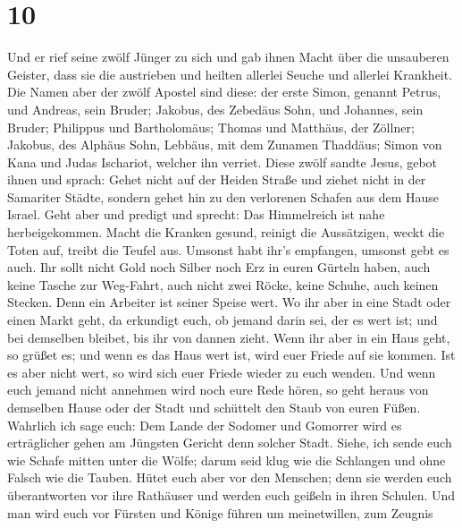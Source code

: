 \hypertarget{section-9}{%
\section{10}\label{section-9}}

 Und er rief seine zwölf Jünger zu sich und gab ihnen
Macht über die unsauberen Geister, dass sie die austrieben und heilten
allerlei Seuche und allerlei Krankheit.  Die Namen aber
der zwölf Apostel sind diese: der erste Simon, genannt Petrus, und
Andreas, sein Bruder; Jakobus, des Zebedäus Sohn, und Johannes, sein
Bruder;  Philippus und Bartholomäus; Thomas und Matthäus,
der Zöllner; Jakobus, des Alphäus Sohn, Lebbäus, mit dem Zunamen
Thaddäus;  Simon von Kana und Judas Ischariot, welcher ihn
verriet.  Diese zwölf sandte Jesus, gebot ihnen und
sprach: Gehet nicht auf der Heiden Straße und ziehet nicht in der
Samariter Städte,  sondern gehet hin zu den verlorenen
Schafen aus dem Hause Israel.  Geht aber und predigt und
sprecht: Das Himmelreich ist nahe herbeigekommen.  Macht
die Kranken gesund, reinigt die Aussätzigen, weckt die Toten auf, treibt
die Teufel aus. Umsonst habt ihr's empfangen, umsonst gebt es auch.
 Ihr sollt nicht Gold noch Silber noch Erz in euren
Gürteln haben,  auch keine Tasche zur Weg-Fahrt, auch
nicht zwei Röcke, keine Schuhe, auch keinen Stecken. Denn ein Arbeiter
ist seiner Speise wert.  Wo ihr aber in eine Stadt oder
einen Markt geht, da erkundigt euch, ob jemand darin sei, der es wert
ist; und bei demselben bleibet, bis ihr von dannen zieht.
 Wenn ihr aber in ein Haus geht, so grüßet es;
 und wenn es das Haus wert ist, wird euer Friede auf sie
kommen. Ist es aber nicht wert, so wird sich euer Friede wieder zu euch
wenden.  Und wenn euch jemand nicht annehmen wird noch
eure Rede hören, so geht heraus von demselben Hause oder der Stadt und
schüttelt den Staub von euren Füßen.  Wahrlich ich sage
euch: Dem Lande der Sodomer und Gomorrer wird es erträglicher gehen am
Jüngsten Gericht denn solcher Stadt.  Siehe, ich sende
euch wie Schafe mitten unter die Wölfe; darum seid klug wie die
Schlangen und ohne Falsch wie die Tauben.  Hütet euch
aber vor den Menschen; denn sie werden euch überantworten vor ihre
Rathäuser und werden euch geißeln in ihren Schulen.  Und
man wird euch vor Fürsten und Könige führen um meinetwillen, zum Zeugnis
